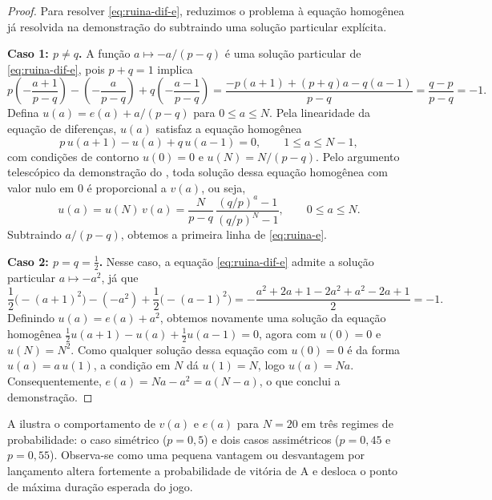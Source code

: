 \documentclass[12pt,portuguese]{article}
\theoremstyle{definition}
\theoremstyle{plainexercise}
\theoremstyle{starredexercise}
\theoremstyle{definition}
\begin{document}
\begin{proof}
Para resolver \eqref{eq:ruina-dif-e}, reduzimos o problema à equação
homogênea já resolvida na demonstração do 
subtraindo uma solução particular explícita.

\smallskip
\noindent\textbf{Caso 1: $p \neq q$.}
A função $a \mapsto -a/(p - q)$ é uma solução particular de
\eqref{eq:ruina-dif-e}, pois $p + q = 1$ implica
\[
p\left(-\frac{a + 1}{p - q}\right)
- \left(-\frac{a}{p - q}\right)
+ q\left(-\frac{a - 1}{p - q}\right)
= \frac{-p(a + 1) + (p + q)a - q(a - 1)}{p - q}
= \frac{q - p}{p - q} = -1.
\]
Defina $u(a) = e(a) + a/(p - q)$ para $0 \leqslant a \leqslant N$. Pela
linearidade da equação de diferenças, $u(a)$ satisfaz a equação homogênea
\[
p\,u(a + 1) - u(a) + q\,u(a - 1) = 0,
\qquad 1 \leqslant a \leqslant N - 1,
\]
com condições de contorno $u(0) = 0$ e $u(N) = N/(p - q)$. Pelo argumento
telescópico da demonstração do , toda solução
dessa equação homogênea com valor nulo em $0$ é proporcional a $v(a)$, ou
seja,
\[
u(a) = u(N)\,v(a)
= \frac{N}{p - q}\,\frac{(q/p)^a - 1}{(q/p)^N - 1},
\qquad 0 \leqslant a \leqslant N.
\]
Subtraindo $a/(p - q)$, obtemos a primeira linha de \eqref{eq:ruina-e}.

\smallskip
\noindent\textbf{Caso 2: $p = q = \tfrac{1}{2}$.}
Nesse caso, a equação \eqref{eq:ruina-dif-e} admite a solução particular
$a \mapsto -a^2$, já que
\[
\frac{1}{2}\bigl(-(a + 1)^2\bigr) - (-a^2) + \frac{1}{2}\bigl(-(a - 1)^2\bigr)
= -\frac{a^2 + 2a + 1 - 2a^2 + a^2 - 2a + 1}{2} = -1.
\]
Definindo $u(a) = e(a) + a^2$, obtemos novamente uma solução da equação
homogênea $\tfrac{1}{2}u(a + 1) - u(a) + \tfrac{1}{2}u(a - 1) = 0$, agora com
$u(0) = 0$ e $u(N) = N^2$. Como qualquer solução dessa equação com $u(0) = 0$
é da forma $u(a) = a\,u(1)$, a condição em $N$ dá $u(1) = N$, logo
$u(a) = Na$. Consequentemente, $e(a) = Na - a^2 = a(N - a)$, o que conclui a
demonstração.
\end{proof}

A  ilustra o comportamento de $v(a)$ e $e(a)$ para
$N = 20$ em três regimes de probabilidade: o caso simétrico ($p = 0{,}5$) e
dois casos assimétricos ($p = 0{,}45$ e $p = 0{,}55$). Observa-se como uma
pequena vantagem ou desvantagem por lançamento altera fortemente a
probabilidade de vitória de A e desloca o ponto de máxima duração esperada do
jogo.
\end{document}
